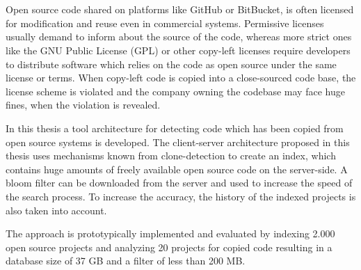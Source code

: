 \chapter{\abstractname}

Open source code shared on platforms like GitHub or BitBucket, is often licensed for modification and reuse even in commercial systems.
Permissive licenses usually demand to inform about the source of the code, whereas more strict ones like the GNU Public License (GPL) or other copy-left licenses require developers to distribute software which relies on the code as open source under the same license or terms.
When copy-left code is copied into a close-sourced code base, the license scheme is violated and the company owning the codebase may face huge fines, when the violation is revealed.

In this thesis a tool architecture for detecting code which has been copied from open source systems is developed.
The client-server architecture proposed in this thesis uses mechanisms known from clone-detection to create an index, which contains huge amounts of freely available open source code on the server-side.
A bloom filter can be downloaded from the server and used to increase the speed of the search process.
To increase the accuracy, the history of the indexed projects is also taken into account.

The approach is prototypically implemented and evaluated by indexing 2.000 open source projects and analyzing 20 projects for copied code resulting in a database size of 37 GB and a filter of less than 200 MB.